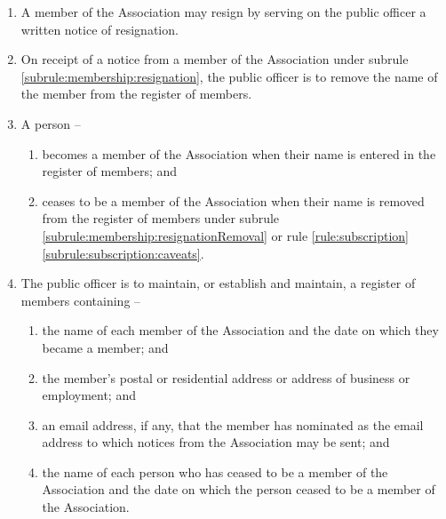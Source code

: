 \begin{enumerate}
	\item \label{subrule:membership:resignation} A member of the Association may resign by serving on the public officer a written notice of resignation.
	\item \label{subrule:membership:resignationRemoval} On receipt of a notice from a member of the Association under subrule \ref{subrule:membership:resignation}, the public officer is to remove the name of the member from the register of members.

	\item A person --
	\begin{enumerate}
		\item becomes a member of the Association when their name is entered in the register of members; and
		\item ceases to be a member of the Association when their name is removed from the register of members under subrule \ref{subrule:membership:resignationRemoval} or rule \ref{rule:subscription} \ref{subrule:subscription:caveats}.
	\end{enumerate}
	
	\item \label{subrule:membership:registry} The public officer is to maintain, or establish and maintain, a register of members containing --
	\begin{enumerate}
		\item the name of each member of the Association and the date on which they became a member; and
		\item the member's postal or residential address or address of business or employment; and
		\item an email address, if any, that the member has nominated as the email address to which notices from the Association may be sent; and
		\item the name of each person who has ceased to be a member of the Association and the date on which the person ceased to be a member of the Association.
	\end{enumerate}
	
\end{enumerate}